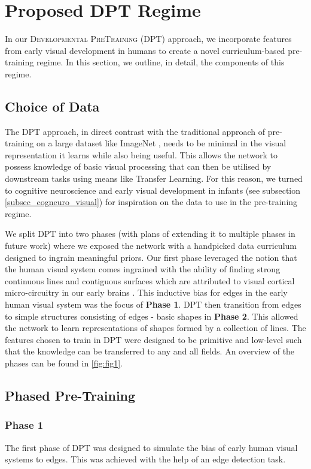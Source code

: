 \section{Proposed DPT Regime}
In our \textsc{Developmental PreTraining} (DPT) approach, we incorporate features from early visual development in humans to create a novel curriculum-based pre-training regime. In this section, we outline, in detail, the components of this regime.

\subsection{Choice of Data}
The DPT approach, in direct contrast with the traditional approach of pre-training on a large dataset like ImageNet \cite{Deng2009ImageNet}, needs to be minimal in the visual representation it learns while also being useful. This allows the network to possess knowledge of basic visual processing that can then be utilised by downstream tasks using means like Transfer Learning. For this reason, we turned to cognitive neuroscience and early visual development in infants (see subsection \ref{subsec_cogneuro_visual}) for inspiration on the data to use in the pre-training regime.

We split DPT into two phases (with plans of extending it to multiple phases in future work) where we exposed the network with a handpicked data curriculum designed to ingrain meaningful priors. Our first phase leveraged the notion that the human visual system comes ingrained with the ability of finding strong continuous lines and contiguous surfaces which are attributed to visual cortical micro-circuitry in our early brains \cite{linsley2020recurrentedge}. This inductive bias for edges in the early human visual system was the focus of \textbf{Phase 1}. DPT then transition from edges to simple structures consisting of edges - basic shapes in \textbf{Phase 2}. This allowed the network to learn representations of shapes formed by a collection of lines. The features chosen to train in DPT were designed to be primitive and low-level such that the knowledge can be transferred to any and all fields. An overview of the phases can be found in \ref{fig:fig1}.

\subsection{Phased Pre-Training}
\subsubsection*{Phase 1}
The first phase of DPT was designed to simulate the bias of early human visual systems to edges. This was achieved with the help of an edge detection task.
